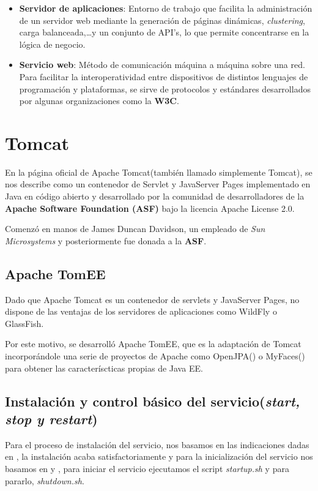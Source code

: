 \documentclass[a4paper, 10pt]{article}
\begin{document}
\begin{itemize}
		\item \textbf{Servidor de aplicaciones}: Entorno de trabajo que facilita la
		administración de un servidor web mediante la generación de páginas dinámicas,
		\textit{clustering}, carga balanceada,\dots y un conjunto de API's, lo que
		permite concentrarse en la lógica de negocio.\cite{AS_Def}

		\item \textbf{Servicio web}: Método de comunicación máquina a máquina sobre
		una red. Para facilitar la interoperatividad entre dispositivos de distintos
		lenguajes de programación y plataformas, se sirve de protocolos y estándares
		desarrollados por algunas organizaciones como la \textbf{W3C}.\cite{WS_Def}
	\end{itemize}

\section{Tomcat}
	En la página oficial de Apache Tomcat\cite{TC_official}(también llamado simplemente Tomcat),
	se nos describe como un contenedor de Servlet y JavaServer Pages implementado en Java en
	código abierto y desarrollado por la comunidad de desarrolladores de la \textbf{Apache
	Software Foundation (ASF)} bajo la licencia Apache License 2.0.
	
	Comenzó en manos de James Duncan Davidson, un empleado de \textit{Sun Microsystems} y
	posteriormente fue donada a la \textbf{ASF}.

	\subsection{Apache TomEE}
		Dado que Apache Tomcat es un contenedor de servlets y JavaServer Pages, no dispone de
		las ventajas de los servidores de aplicaciones como WildFly o GlassFish.
		
		Por este motivo, se desarrolló Apache TomEE, que es la adaptación de Tomcat
		incorporándole una serie de proyectos de Apache como OpenJPA(\cite{TC_OpenJPA}) o
		MyFaces(\cite{TC_MyFaces}) para obtener las caracteríscticas propias de Java EE.\cite{TC_TomEE}
	
	\subsection{Instalación y control básico del servicio(\textit{start, stop y restart})}
		Para el proceso de instalación del servicio, nos basamos en las indicaciones dadas en
		\cite{TC_install}, la instalación acaba satisfactoriamente y para la inicialización del
		servicio nos basamos en \cite{TC_install} y \cite{TC_config}, para iniciar el servicio
		ejecutamos el script \textit{startup.sh} y para pararlo, \textit{shutdown.sh}.
		
\end{document}

